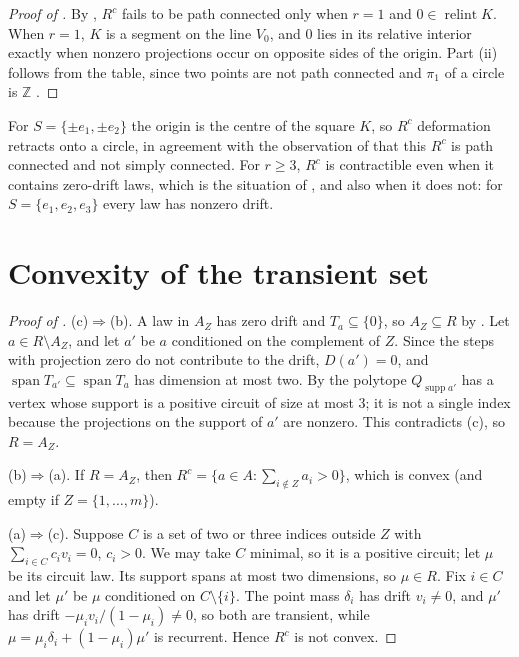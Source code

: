 \documentclass[11pt]{article}
\theoremstyle{remark}
\DeclareMathOperator{\supp}{supp}
\DeclareMathOperator{\spn}{span}
\DeclareMathOperator{\relint}{relint}
\newcommand{\Z}{\mathbb{Z}}
\begin{document}
\begin{proof}[Proof of ]
By , $R^c$ fails to be path connected only when $r=1$ and $0\in\relint K$. When $r=1$, $K$ is a segment
on the line $V_0$, and $0$ lies in its relative interior exactly when nonzero projections occur on opposite sides of the
origin. Part (ii) follows from the table, since two points are not path connected and $\pi_1$ of a circle is $\Z$
\cite[Theorem~1.7]{Hatcher}.
\end{proof}

For $S=\{\pm e_1,\pm e_2\}$ the origin is the centre of the square $K$, so $R^c$ deformation retracts onto a circle, in
agreement with the observation of \cite{LMW} that this $R^c$ is path connected and not simply connected. For $r\ge 3$, $R^c$ is contractible even when it contains zero-drift laws, which is the
situation of \cite[Theorem~6.9]{LMW}, and also when it does not: for $S=\{e_1,e_2,e_3\}$ every law has nonzero drift.

\section{Convexity of the transient set}\label{sec:convex}

\begin{proof}[Proof of ]
(c)$\Rightarrow$(b). A law in $A_Z$ has zero drift and $T_a\subseteq\{0\}$, so $A_Z\subseteq R$ by
. Let $a\in R\setminus A_Z$, and let $a'$
be $a$ conditioned on the complement of $Z$. Since the steps with projection zero do not contribute to the drift, $D(a')=0$, and
$\spn T_{a'}\subseteq\spn T_a$ has dimension at most two. By  the polytope $Q_{\supp a'}$ has a vertex whose
support is a positive circuit of size at most $3$; it is not a single index because the projections on the
support of $a'$ are nonzero. This contradicts (c), so $R=A_Z$.

(b)$\Rightarrow$(a). If $R=A_Z$, then $R^c=\{a\in A:\sum_{i\notin Z}a_i>0\}$, which is convex (and empty if
$Z=\{1,\dots,m\}$).

(a)$\Rightarrow$(c). Suppose $C$ is a set of two or three indices outside $Z$ with $\sum_{i\in C}c_iv_i=0$, $c_i>0$. We may
take $C$ minimal, so it is a positive circuit; let $\mu$ be its circuit law. Its support spans at most two dimensions,
so $\mu\in R$. Fix $i\in C$ and let $\mu'$ be $\mu$ conditioned on $C\setminus\{i\}$. The point mass $\delta_i$ has drift $v_i\neq 0$,
and $\mu'$ has drift $-\mu_iv_i/(1-\mu_i)\neq 0$, so both are transient, while $\mu=\mu_i\delta_i+(1-\mu_i)\mu'$ is recurrent. Hence $R^c$
is not convex.
\end{proof}
\end{document}
